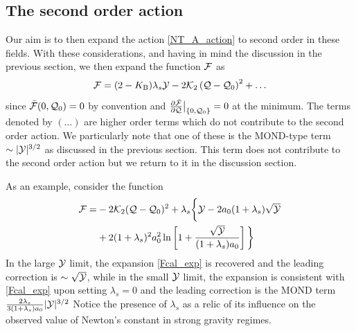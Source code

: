 \documentclass[twocolumn,prd,preprintnumbers,amsmath,amssymb,nofootinbib,superscriptaddress]{revtex4-1}
\newcommand{\lambdas}{\lambda_s}
\newcommand{\Kcal}{{\cal K}}
\newcommand{\Fcal}{{\cal F}}
\newcommand{\Qcal}{{\cal Q}}
\newcommand{\Ycal}{{\cal Y}}
\newcommand{\KB}{\ensuremath{K_{{\rm B}}}}
\begin{document}
\subsection{The second order action}
 Our aim is to then expand the action \eqref{NT_A_action} to second order in these fields.
With these considerations, and having in mind the discussion in the previous section, we then expand the function $\Fcal$ as
\begin{equation}
\Fcal =   (2-\KB)\lambdas \Ycal  - 2 \Kcal_2  \left(\Qcal - \Qcal_0\right)^2 + \ldots
\label{Fcal_exp}
\end{equation}
since  $\bar{\Fcal}(0,\Qcal_0) = 0$ by convention and $\frac{\partial \bar{\Fcal}}{\partial \Qcal}\big|_{ \{0,\Qcal_0 \} } = 0$ at the minimum. The 
terms denoted by $(\ldots)$ are higher order terms which do not contribute to the second order action. We particularly note that one of these is the MOND-type term $\sim |\Ycal|^{3/2}$ 
as discussed in the previous section. This term does not contribute to the second order action but we return to it in the discussion section.

As an example, consider  the function 
\begin{align}
\Fcal =&
- 2 \Kcal_2 (\Qcal - \Qcal_0)^2
+ \lambdas \bigg\{\Ycal - 2 a_0 (1+\lambdas) \sqrt{\Ycal} 
\nonumber
\\
&
+2 (1+\lambdas)^2a_0^2 \ln\left[1  +  \frac{\sqrt{\Ycal}}{ (1+\lambdas)a_0}\right]\bigg\} 
\end{align}
In the large $\Ycal$ limit, the expansion \eqref{Fcal_exp} is recovered and the leading correction is $\sim \sqrt{\Ycal}$, while in the small $\Ycal$ limit,
 the expansion is consistent with \eqref{Fcal_exp} upon setting $\lambdas=0$ and the leading correction is the MOND term $\frac{2\lambdas}{3(1+\lambdas) a_0} |\Ycal|^{3/2}$
Notice the presence of $\lambdas$ as a relic of its influence on the observed value of Newton's constant in strong gravity regimes.
\end{document}
